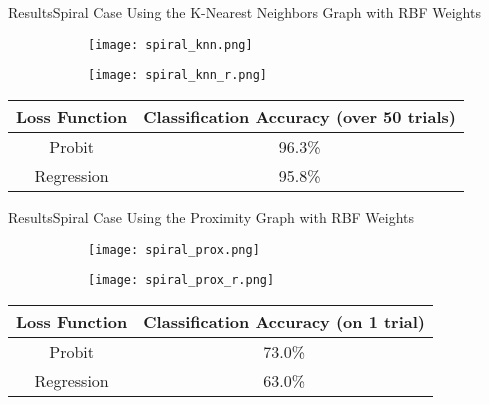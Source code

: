 \begin{frame}{Results}{Spiral Case}
    Using the K-Nearest Neighbors Graph with RBF Weights
    \begin{figure}[h!]
        \begin{subfigure}[b]{0.45\textwidth}
            \texttt{[image: spiral\_knn.png]}
        \end{subfigure}
        \begin{subfigure}[b]{0.45\textwidth}
            \texttt{[image: spiral\_knn\_r.png]}
        \end{subfigure}
    \end{figure}
    \begin{center}
        \begin{tabular}{|c|c|}
            \hline
            Loss Function & Classification Accuracy (over 50 trials) \\
            \hline
            Probit & 96.3\% \\
            Regression & 95.8\% \\
            \hline
        \end{tabular}
    \end{center}
\end{frame}

\begin{frame}{Results}{Spiral Case}
    Using the Proximity Graph with RBF Weights
    \begin{figure}[h!]
        \begin{subfigure}[b]{0.45\textwidth}
            \texttt{[image: spiral\_prox.png]}
        \end{subfigure}
        \begin{subfigure}[b]{0.45\textwidth}
            \texttt{[image: spiral\_prox\_r.png]}
        \end{subfigure}
    \end{figure}
    \begin{center}
        \begin{tabular}{|c|c|}
            \hline
            Loss Function & Classification Accuracy (on 1 trial) \\
            \hline
            Probit & 73.0\% \\
            Regression & 63.0\% \\
            \hline
        \end{tabular}
    \end{center}
\end{frame}

